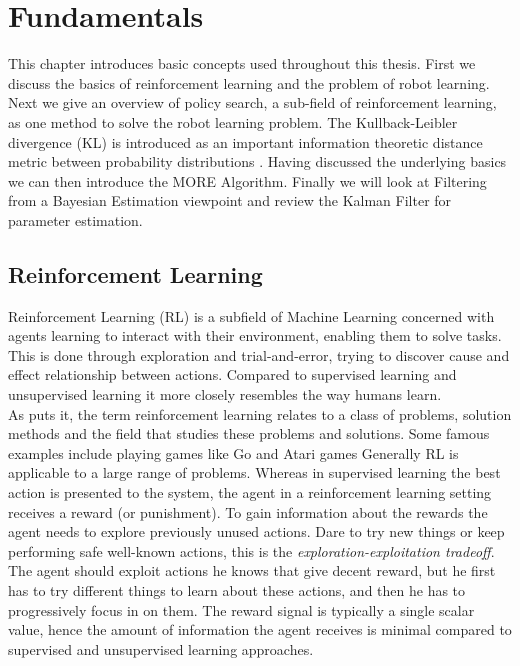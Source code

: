 
\chapter{Fundamentals}
This chapter introduces basic concepts used throughout this thesis.
First we discuss the basics of reinforcement learning and
the problem of robot learning.
Next we give an overview of policy search, a sub-field of reinforcement learning,
as one method to solve the robot learning problem.
The Kullback-Leibler divergence (KL) is introduced as an important information theoretic
distance metric between probability distributions \citep{kullback1951information}.
Having discussed the underlying basics we can then
introduce the MORE Algorithm.
Finally we will look at Filtering from a Bayesian Estimation viewpoint and
review the Kalman Filter for parameter estimation.

\section{Reinforcement Learning}
Reinforcement Learning (RL) is a subfield of Machine Learning concerned with agents
learning to interact with their environment, enabling them to solve tasks.
This is done through exploration and trial-and-error, trying to discover
cause and effect relationship between actions.
Compared to supervised learning and unsupervised learning it
more closely resembles the way humans learn. \\
As \citet{sutton2018reinforcement} puts it,
the term reinforcement learning relates to a class of problems,
solution methods and the field that studies these problems and solutions.
Some famous examples include playing games like Go
\citep{silver2016mastering} and Atari games \citep{mnih2013playing}
Generally RL is applicable to a large range of problems.
Whereas in supervised learning the best action is presented to the system,
the agent in a reinforcement learning setting receives a
reward (or punishment).
To gain information about the rewards the agent needs
to explore previously unused actions.
Dare to try new things or keep performing safe
well-known actions, this is the \textit{exploration-exploitation tradeoff}.
The agent should exploit actions he knows that
give decent reward, but he first
has to try different things to learn about these actions,
and then he has to progressively focus in on them.
The reward signal is typically a single scalar value, hence the amount of information
the agent receives is minimal compared to
supervised and unsupervised learning approaches.

